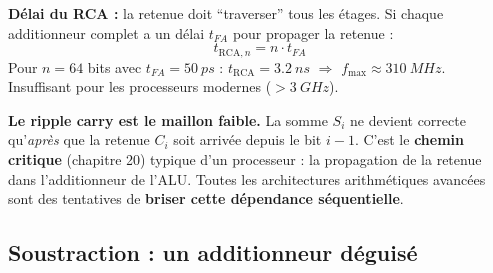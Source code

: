 \documentclass[12pt,a4paper,twoside]{book}
\begin{document}
\begin{center}
\end{center}

\begin{formule}
\textbf{Délai du RCA :} la retenue doit ``traverser'' tous les étages. Si chaque additionneur complet a un délai $t_{FA}$ pour propager la retenue :
\[
\boxed{t_{\text{RCA},n} = n \cdot t_{FA}}
\]
Pour $n = 64$ bits avec $t_{FA} = \SI{50}{ps}$ : $t_{\text{RCA}} = \SI{3.2}{ns}$ $\Rightarrow$ $f_{\max} \approx \SI{310}{MHz}$. Insuffisant pour les processeurs modernes ($> \SI{3}{GHz}$).
\end{formule}

\begin{attention}
\textbf{Le ripple carry est le maillon faible.} La somme $S_i$ ne devient correcte qu'\textit{après} que la retenue $C_i$ soit arrivée depuis le bit $i-1$. C'est le \textbf{chemin critique} (chapitre 20) typique d'un processeur : la propagation de la retenue dans l'additionneur de l'ALU. Toutes les architectures arithmétiques avancées sont des tentatives de \textbf{briser cette dépendance séquentielle}.
\end{attention}

\subsection{Soustraction : un additionneur déguisé}
\end{document}
